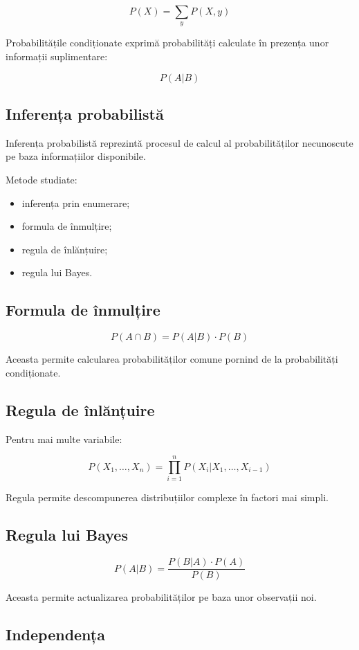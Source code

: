 \documentclass[12pt,a4paper]{article}
\begin{document}
\[
P(X)
=
\sum_y P(X,y)
\]

Probabilitățile condiționate exprimă probabilități calculate în prezența unor informații suplimentare:

\[
P(A|B)
\]

\subsection{Inferența probabilistă}

Inferența probabilistă reprezintă procesul de calcul al probabilităților necunoscute pe baza informațiilor disponibile.

Metode studiate:

\begin{itemize}
\item inferența prin enumerare;
\item formula de înmulțire;
\item regula de înlănțuire;
\item regula lui Bayes.
\end{itemize}

\subsection{Formula de înmulțire}

\[
P(A \cap B)
=
P(A|B)\cdot P(B)
\]

Aceasta permite calcularea probabilităților comune pornind de la probabilități condiționate.

\subsection{Regula de înlănțuire}

Pentru mai multe variabile:

\[
P(X_1,\dots,X_n)
=
\prod_{i=1}^{n}
P(X_i|X_1,\dots,X_{i-1})
\]

Regula permite descompunerea distribuțiilor complexe în factori mai simpli.

\subsection{Regula lui Bayes}

\[
P(A|B)
=
\frac
{P(B|A)\cdot P(A)}
{P(B)}
\]

Aceasta permite actualizarea probabilităților pe baza unor observații noi.

\subsection{Independența}
\end{document}
